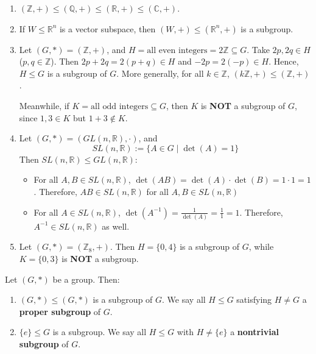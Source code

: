 \begin{example}
\begin{enumerate}
    \item $(\mathbb{Z}, +) \le (\mathbb{Q}, +) \le (\mathbb{R}, +) \le (\mathbb{C}, +)$.
    \item If $W \leq \mathbb{R}^n$ is a vector subspace, then $(W, +) \leq (\mathbb{R}^n, +)$ is a subgroup.
    \item Let $(G, *) = (\mathbb{Z}, +)$, and $H = \text{all even integers} = 2\mathbb{Z} \subseteq G$. Take $2p, 2q \in H$ ($p, q \in \mathbb{Z}$). Then $2p + 2q = 2(p+q) \in H$ and $-2p = 2(-p) \in H$. Hence, $H \le G$ is a subgroup of $G$.
    More generally, for all $k \in \mathbb{Z}$, $(k\mathbb{Z},+) \le (\mathbb{Z},+)$.
    
    Meanwhile, if $K = \text{all odd integers} \subseteq G$, then $K$ is \textbf{NOT} a subgroup of $G$, since $1, 3 \in K$ but $1 + 3 \notin K$.
    
    \item Let $(G, *) = (GL(n, \mathbb{R}), \cdot)$, and 
    $$SL(n, \mathbb{R}) := \{ A \in G \mid \det(A) = 1 \}$$ 
    Then $SL(n,\mathbb{R}) \leq GL(n, \mathbb{R})$:
    \begin{itemize} 
    \item For all $A, B \in SL(n, \mathbb{R})$,  $\det(AB) = \det(A) \cdot \det(B) = 1 \cdot 1 = 1$. Therefore, $AB \in SL(n, \mathbb{R})$ 
    for all $A, B \in SL(n, \mathbb{R})$ 
    \item For all $A \in SL(n, \mathbb{R})$, $\det(A^{-1}) = \frac{1}{\det(A)} = \frac{1}{1} = 1$. Therefore, $A^{-1} \in SL(n, \mathbb{R})$ as well.
    \end{itemize}
    \item Let $(G, *) = (\mathbb{Z}_8, +)$. Then $ H = \{0, 4\}$ is a subgroup of $G$, while $K = \{0, 3\}$ is \textbf{NOT} a subgroup.
\end{enumerate}
\end{example}

\begin{definition}
Let $(G, *)$ be a group. Then:
    \begin{enumerate}
        \item $(G, *) \le (G, *)$ is a subgroup of $G$. We say all $H \le G$ satisfying $H \neq G$ a {\bf proper subgroup} of $G$.
        \item $\{e\} \le G$ is a subgroup. We say all $H \le G$ with $H \neq \{e\}$ a {\bf nontrivial subgroup} of $G$.
    \end{enumerate}
\end{definition}


